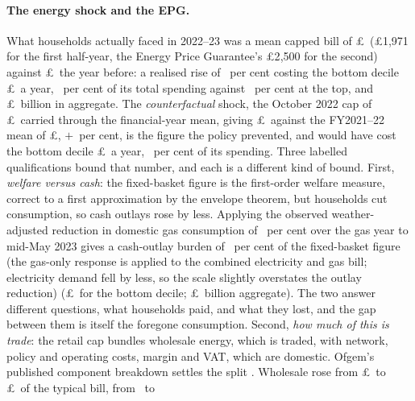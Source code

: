 \paragraph{The energy shock and the EPG.} What households actually
faced in 2022--23 was a mean capped bill of
\pounds\MsEnergyRealisedMeanCapFyTwentyTwo\ (\pounds 1{,}971 for the
first half-year, the Energy Price Guarantee's \pounds 2{,}500 for the
second) against \pounds\MsEnergyRealisedMeanCapFyTwentyOne\ the year
before: a realised rise of \MsEnergyRealisedRisePct\ per cent costing
the bottom decile \pounds\MsEnergyRealisedGbpDecOne\ a year,
\MsEnergyRealisedPctSpendDecOne\ per cent of its total spending against
\MsEnergyRealisedPctSpendDecTen\ per cent at the top, and
\pounds\MsEnergyRealisedAggBn\ billion in aggregate. The
\emph{counterfactual} shock, the October 2022 cap of
\pounds\MsEnergyCapPeak\ carried through the financial-year mean, giving
\pounds\SsCounterFyCap\ against the FY2021--22 mean of
\pounds\MsEnergyRealisedMeanCapFyTwentyOne, $+$\MsEnergyGrossFactorPct\ per cent, is the
figure the policy prevented, and would have cost the bottom decile
\pounds\MsEnergyGrossGbpDecOne\ a year, \MsEnergyGrossPctSpendDecOne\
per cent of its spending. Three labelled qualifications bound that number, and each is a
different kind of bound. First, \emph{welfare versus cash}: the
fixed-basket figure is the first-order welfare measure, correct to a
first approximation by the envelope theorem, but households cut
consumption, so cash outlays rose by less. Applying the observed
weather-adjusted reduction in domestic gas consumption of
\MsEnergyObservedDemandFallPct\ per cent over the gas year to mid-May
2023 \citep{desnz2024} gives a cash-outlay burden of
\MsEnergyCashOutlayScalePct\ per cent of the fixed-basket figure
(the gas-only response is applied to the combined electricity and gas
bill; electricity demand fell by less, so the scale slightly
overstates the outlay reduction)
(\pounds\MsEnergyCashOutlayGbpDecOne\ for the bottom decile;
\pounds\MsEnergyCashOutlayAggBn\ billion aggregate). The two answer
different questions, what households paid, and what they lost, and
the gap between them is itself the foregone consumption. Second, \emph{how much of this is trade}: the retail cap bundles
wholesale energy, which is traded, with network, policy and operating
costs, margin and VAT, which are domestic. Ofgem's published component
breakdown settles the split \citep{ofgem2022}. Wholesale rose from
\pounds\MsEnergyWholesaleBase\ to \pounds\MsEnergyWholesalePeak\ of the
typical bill, from \MsEnergyWholesaleShareCapBasePct\ to

